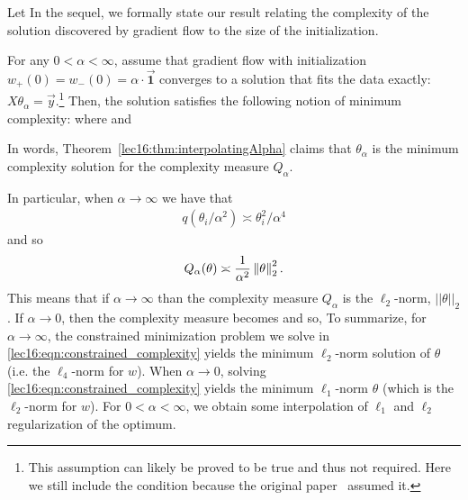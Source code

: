 Let
In the sequel, we formally state our result relating the complexity of the solution discovered by gradient flow to the size of the initialization.
\begin{theorem}
	 \label{lec16:thm:interpolatingAlpha}
For any $0 < \alpha < \infty$, assume that gradient flow with initialization $w_+(0) = w_-(0) = \alpha \cdot \vec{\mathbf{1}}$ converges to a solution that fits the data exactly: $X \theta_{\alpha} = \vec{y}$.\footnote{This assumption can likely be proved to be true and thus not required. Here we still include the condition because the original paper~\citet{woodworth2020kernel} assumed it.}  Then, the solution satisfies the following notion of minimum complexity:
where
and
\end{theorem}
In words, Theorem~\ref{lec16:thm:interpolatingAlpha} claims that $\theta_\alpha$ is the minimum complexity solution for the complexity measure $Q_\alpha$.

\begin{remark}
In particular, when $\alpha \to \infty$ we have that 
\begin{align}
    q(\theta_i /\alpha^2) \asymp \theta_i^2/\alpha^4
\end{align}
and so 
\begin{align}
    Q_\alpha(\theta) \asymp \frac{1}{\alpha^2} \left\|\theta\right\|_2^2.
\end{align}
This means that if $\alpha \to \infty$ than the complexity measure $Q_\alpha$ is the $\ell_2$-norm, $||\theta||_2$.  If $\alpha \to 0$, then the complexity measure becomes
and so,
To summarize, for $\alpha \to \infty$, the constrained minimization problem we solve in \eqref{lec16:eqn:constrained_complexity} yields the minimum $\ell_2$-norm solution of $\theta$ (i.e. the $\ell_4$-norm for $w$).  When $\alpha \to 0$, solving \eqref{lec16:eqn:constrained_complexity} yields the minimum $\ell_1$-norm $\theta$ (which is the $\ell_2$-norm for $w$).  For $0 < \alpha < \infty$, we obtain some interpolation of $\ell_1$ and $\ell_2$ regularization of the optimum.
\end{remark}

